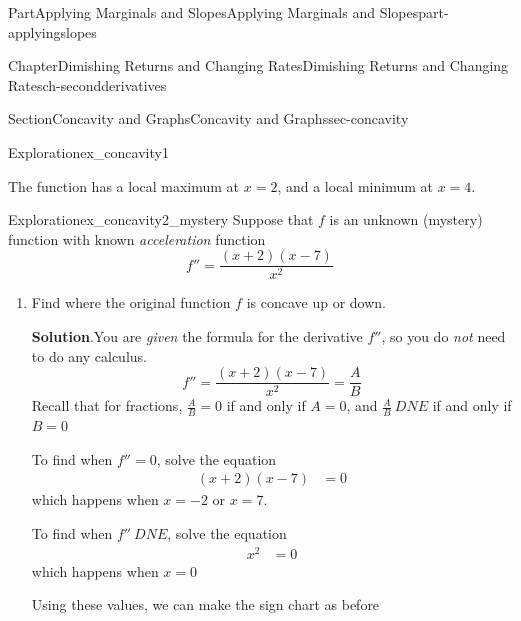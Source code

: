 \documentclass{tufte-book}
\newcommand{\blocktitlefont}{\relax}
\numberwithin{equation}{chapter}
\newcommand{\amp}{&}
\begin{document}
\begin{partptx}{Part}{Applying Marginals and Slopes}{}{Applying Marginals and Slopes}{}{}{part-applyingslopes}
\begin{chapterptx}{Chapter}{Dimishing Returns and Changing Rates}{}{Dimishing Returns and Changing Rates}{}{}{ch-secondderivatives}
\begin{sectionptx}{Section}{Concavity and Graphs}{}{Concavity and Graphs}{}{}{sec-concavity}
\begin{exploration}{Exploration}{}{ex_concavity1}
\begin{enumerate}[font=\bfseries,label=(\alph*),ref=\alph*]
\begin{image}{0.25}{0.5}{0.25}{}
{
}%
\end{image}%
 The function has a local maximum at \(x=2\), and a local minimum at \(x=4\).%
\end{enumerate}%
\end{exploration}%
\begin{exploration}{Exploration}{}{ex_concavity2_mystery}%
Suppose that \(f\) is an unknown (mystery) function with known \emph{acceleration} function%
\begin{equation*}
f'' = \dfrac{(x+2)(x-7)}{x^2}
\end{equation*}
%
\begin{enumerate}[font=\bfseries,label=(\alph*),ref=\alph*]%
\item{}Find where the original function \(f\) is concave up or down.%
\par\smallskip%
\noindent\textbf{\blocktitlefont Solution}.\hypertarget{ex_concavity2_mystery-2-2}{}\quad{}You are \emph{given} the formula for the derivative \(f''\), so you do \emph{not} need to do any calculus.%
\begin{equation*}
f'' = \dfrac{(x+2)(x-7)}{x^2} = \dfrac{A}{B}
\end{equation*}
Recall that for fractions, \(\frac{A}{B}=0\) if and only if \(A=0\), and \(\frac{A}{B}\ DNE\) if and only if \(B=0\)%
\par
To find when \(f''=0\), solve the equation%
\begin{align*}
(x+2)(x-7) \amp = 0 
\end{align*}
which happens when \(x=-2\) or \(x=7\).%
\par
To find when \(f''\ DNE\), solve the equation%
\begin{align*}
x^2 \amp =0
\end{align*}
which happens when \(x=0\)%
\par
Using these values, we can make the sign chart as before \begin{image}{0.125}{0.75}{0.125}{}%
\resizebox{\linewidth}{!}{%
}
\end{image}
\end{enumerate}
\end{exploration}
\end{sectionptx}
\end{chapterptx}
\end{partptx}
\end{document}
